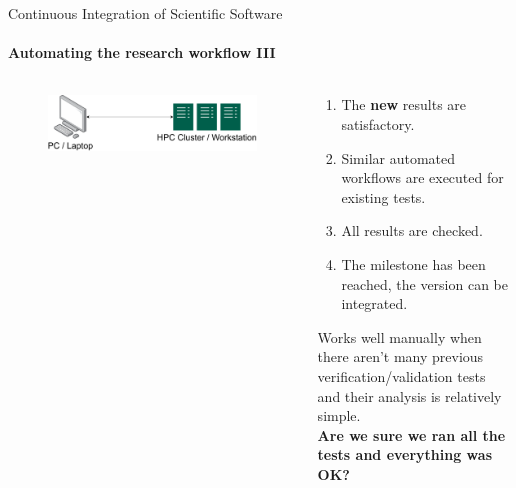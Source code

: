 \begin{frame}{Continuous Integration of Scientific Software}
    \framesubtitle{Automating the research workflow III} 
    \vfill

        \begin{columns}
            \begin{column}[c]{0.5\textwidth}
                \begin{figure}
                    \centering
                    \includegraphics[width=\columnwidth]{figures/workflow-overview.png}
                \end{figure}
            \end{column}
            \begin{column}[c]{0.5\textwidth}
                \begin{enumerate} 
                    \item The \textbf{new} results are satisfactory. 
                    \item Similar automated workflows are executed for existing tests. 
                    \item All results are checked. 
                    \item The milestone has been reached, the version can be integrated.
                \end{enumerate}
                Works well manually when there aren't many previous verification/validation tests and their analysis is relatively simple.\\
                \textbf{Are we sure we ran all the tests and everything was OK?}
                
            \end{column}
        \end{columns}
\end{frame}

